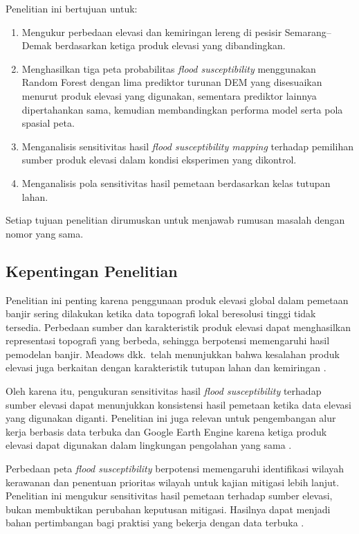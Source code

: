 \documentclass[12pt]{article}
\begin{document}
Penelitian ini bertujuan untuk:

\begin{enumerate}
\item Mengukur perbedaan elevasi dan kemiringan lereng di pesisir
Semarang--Demak berdasarkan ketiga produk elevasi yang dibandingkan.
\item Menghasilkan tiga peta probabilitas \textit{flood susceptibility}
menggunakan Random Forest dengan lima prediktor turunan DEM yang
disesuaikan menurut produk elevasi yang digunakan, sementara prediktor
lainnya dipertahankan sama, kemudian membandingkan performa model serta pola
spasial peta.
\item Menganalisis sensitivitas hasil \textit{flood susceptibility mapping}
terhadap pemilihan sumber produk elevasi dalam kondisi eksperimen yang
dikontrol.
\item Menganalisis pola sensitivitas hasil pemetaan berdasarkan kelas
tutupan lahan.
\end{enumerate}

Setiap tujuan penelitian dirumuskan untuk menjawab rumusan masalah dengan
nomor yang sama.

\subsection{Kepentingan Penelitian}

Penelitian ini penting karena penggunaan produk elevasi global dalam
pemetaan banjir sering dilakukan ketika data topografi lokal beresolusi
tinggi tidak tersedia. Perbedaan sumber dan karakteristik produk elevasi
dapat menghasilkan representasi topografi yang berbeda, sehingga berpotensi
memengaruhi hasil pemodelan banjir. Meadows dkk.\ telah menunjukkan bahwa
kesalahan produk elevasi juga berkaitan dengan karakteristik tutupan lahan
dan kemiringan \cite{meadows2024}.

Oleh karena itu, pengukuran sensitivitas hasil \textit{flood susceptibility}
terhadap sumber elevasi dapat menunjukkan konsistensi hasil pemetaan ketika
data elevasi yang digunakan diganti. Penelitian ini juga
relevan untuk pengembangan alur kerja berbasis data terbuka dan Google Earth
Engine karena ketiga produk elevasi dapat digunakan dalam lingkungan
pengolahan yang sama \cite{gorelick2017}.

Perbedaan peta \textit{flood susceptibility} berpotensi memengaruhi
identifikasi wilayah kerawanan dan penentuan prioritas wilayah untuk kajian
mitigasi lebih lanjut. Penelitian ini mengukur sensitivitas hasil pemetaan
terhadap sumber elevasi, bukan membuktikan perubahan keputusan mitigasi.
Hasilnya dapat menjadi bahan pertimbangan bagi praktisi yang bekerja dengan
data terbuka \cite{fereshtehpour2024}.
\end{document}
